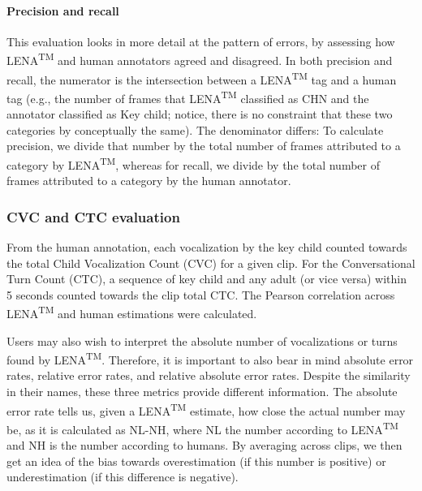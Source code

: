 \documentclass[english,table,man,floatsintext]{apa6}
\let\oldparagraph\paragraph
\renewcommand{\paragraph}[1]{\oldparagraph{#1}\mbox{}}
\begin{document}
\hypertarget{precision-and-recall}{%
\paragraph{Precision and recall}\label{precision-and-recall}}

This evaluation looks in more detail at the pattern of errors, by assessing how LENA\textsuperscript{TM} and human annotators agreed and disagreed. In both precision and recall, the numerator is the intersection between a LENA\textsuperscript{TM} tag and a human tag (e.g., the number of frames that LENA\textsuperscript{TM} classified as CHN and the annotator classified as Key child; notice, there is no constraint that these two categories by conceptually the same). The denominator differs: To calculate precision, we divide that number by the total number of frames attributed to a category by LENA\textsuperscript{TM}, whereas for recall, we divide by the total number of frames attributed to a category by the human annotator.

\hypertarget{cvc-and-ctc-evaluation}{%
\subsubsection{CVC and CTC evaluation}\label{cvc-and-ctc-evaluation}}

From the human annotation, each vocalization by the key child counted towards the total Child Vocalization Count (CVC) for a given clip. For the Conversational Turn Count (CTC), a sequence of key child and any adult (or vice versa) within 5 seconds counted towards the clip total CTC. The Pearson correlation across LENA\textsuperscript{TM} and human estimations were calculated.

Users may also wish to interpret the absolute number of vocalizations or turns found by LENA\textsuperscript{TM}. Therefore, it is important to also bear in mind absolute error rates, relative error rates, and relative absolute error rates. Despite the similarity in their names, these three metrics provide different information. The absolute error rate tells us, given a LENA\textsuperscript{TM} estimate, how close the actual number may be, as it is calculated as NL-NH, where NL the number according to LENA\textsuperscript{TM} and NH is the number according to humans. By averaging across clips, we then get an idea of the bias towards overestimation (if this number is positive) or underestimation (if this difference is negative).
\end{document}
